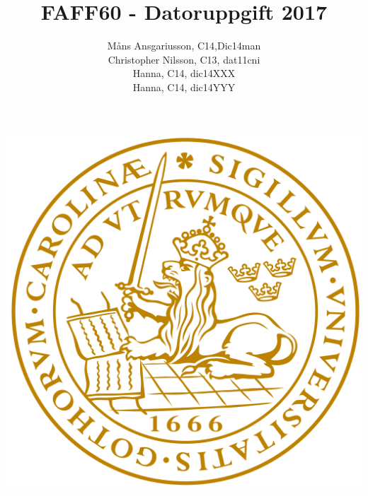 \documentclass{article}
\begin{document}
\title{FAFF60 - Datoruppgift 2017}
\author{Måns Ansgariusson, C14,Dic14man\\ Christopher Nilsson, C13, dat11cni \\ Hanna, C14, dic14XXX \\ Hanna, C14, dic14YYY }
\maketitle
\centerline{\includegraphics[width=\textwidth]{LTH.png}}
\newpage
\end{document}
